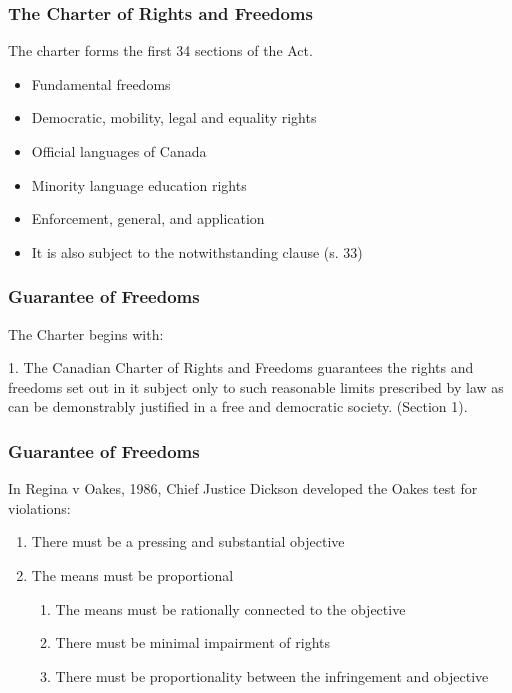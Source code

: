 \begin{frame}
\frametitle{The Charter of Rights and Freedoms}
The charter forms the first 34 sections of the Act.

\begin{itemize}
	\item Fundamental freedoms
	\item Democratic, mobility, legal and equality rights
	\item Official languages of Canada
	\item Minority language education rights
	\item Enforcement, general, and application
	\item It is also subject to the notwithstanding clause (s. 33)
\end{itemize}

\end{frame}



\begin{frame}
\frametitle{Guarantee of Freedoms}

The Charter begins with:

1. The Canadian Charter of Rights and Freedoms guarantees the rights and freedoms set out in it subject only to such reasonable limits prescribed by law as can be demonstrably justified in a free and democratic society. (Section 1).


\end{frame}



\begin{frame}
\frametitle{Guarantee of Freedoms}

In Regina v Oakes, 1986, Chief Justice Dickson developed the Oakes test for violations:  
\begin{enumerate}
\item There must be a pressing and substantial objective
\item The means must be proportional 
	\begin{enumerate}[a]
		\item The means must be rationally connected to the objective
		\item There must be minimal impairment of rights
		\item There must be proportionality between the infringement and objective
	\end{enumerate}
\end{enumerate}

\end{frame}



